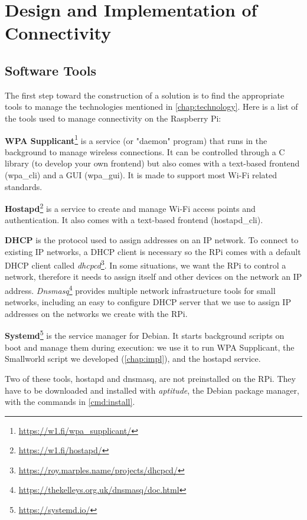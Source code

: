 \documentclass[a4paper,11pt,oneside]{report}
\begin{document}
\chapter{Design and Implementation of Connectivity}

\section{Software Tools}
\label{chap:tools}

The first step toward the construction of a solution is to find the appropriate tools to manage the technologies mentioned in \autoref{chap:technology}. Here is a list of the tools used to manage connectivity on the Raspberry Pi:

\textbf{WPA Supplicant}\footnote{\url{https://w1.fi/wpa_supplicant/}} is a service (or "daemon" program) that runs in the background to manage wireless connections. It can be controlled through a C library (to develop your own frontend) but also comes with a text-based frontend (wpa\_cli) and a GUI (wpa\_gui). It is made to support most Wi-Fi related standards.

\textbf{Hostapd}\footnote{\url{https://w1.fi/hostapd/}} is a service to create and manage Wi-Fi access points and authentication. It also comes with a text-based frontend (hostapd\_cli).

\textbf{DHCP} is the protocol used to assign addresses on an IP network. To connect to existing IP networks, a DHCP client is necessary so the RPi comes with a default DHCP client called \emph{dhcpcd}\footnote{\url{https://roy.marples.name/projects/dhcpcd/}}. In some situations, we want the RPi to control a network, therefore it needs to assign itself and other devices on the network an IP address. \emph{Dnsmasq}\footnote{\url{https://thekelleys.org.uk/dnsmasq/doc.html}} provides multiple network infrastructure tools for small networks, including an easy to configure DHCP server that we use to assign IP addresses on the networks we create with the RPi.

\textbf{Systemd}\footnote{\url{https://systemd.io/}} is the service manager for Debian. It starts background scripts on boot and manage them during execution: we use it to run WPA Supplicant,
the Smallworld script we developed (\autoref{chap:impl}), and the hostapd service.

Two of these tools, hostapd and dnsmasq, are not preinstalled on the RPi. They have to be downloaded and installed with \emph{aptitude}, the Debian package manager, with the commands in \autoref{cmd:install}.
\end{document}
